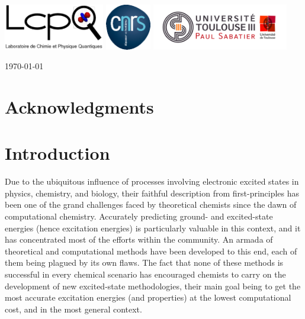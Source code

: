 \documentclass[11pt,a4paper]{article}
\begin{document}
\begin{center}
\vspace{0.5cm}
\includegraphics[height=2cm]{LCPQ_logo.pdf} \hfill \includegraphics[height=2cm]{LogoCNRS.eps} \hfill \includegraphics[height=2cm]{UPS_logo.jpg}

\end{center}

\vfill
\hfill \today

\newpage

\setlength{\parindent}{17pt}

\section*{Acknowledgments}

\tableofcontents

\newpage

\section{Introduction}

Due to the ubiquitous influence of processes involving electronic excited states in physics, chemistry, and biology, their faithful description from first-principles has been one of the grand challenges faced by theoretical chemists since the dawn of computational chemistry. 
Accurately predicting ground- and excited-state energies (hence excitation energies) is particularly valuable in this context, and it has concentrated most of the efforts within the community.
An armada of theoretical and computational methods have been developed to this end, each of them being plagued by its own flaws. 
The fact that none of these methods is successful in every chemical scenario has encouraged chemists to carry on the development of new excited-state methodologies, their main goal being to get the most accurate excitation energies (and properties) at the lowest computational cost, and in the most general context.
\end{document}
